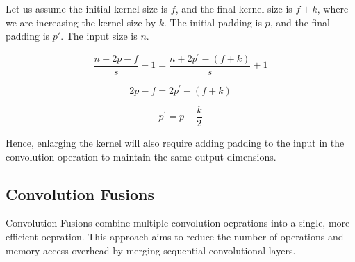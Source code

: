 \documentclass[12pt,a4paper,twoside,openright,bibliography=totocnumbered]{report}
\begin{document}
              Let us assume the initial kernel size is $f$, and the final kernel size is $f+k$, where we are increasing the kernel size by $k$. The initial padding is $p$, and the final padding is $p'$. The input size is $n$.

               \begin{equation}
                    \frac{n+2p-f}{s} + 1 = \frac{n+2p^\prime-(f+k)}{s} + 1
                \label{eq:enlarge1}
                \end{equation}

                \begin{equation}
                    2p-f= 2p^\prime-(f+k)
                \label{eq:enlarge2}
                \end{equation}

                \begin{equation}
                    \boxed{p^\prime = p + \frac{k}{2}}
                \label{eq:enlarge2}
                \end{equation}

                Hence, enlarging the kernel will also require adding padding to the input in the convolution operation to maintain the same output dimensions.

            \subsection{Convolution Fusions}
            Convolution Fusions combine multiple convolution oeprations into a single, more efficient oepration. This approach aims to reduce the number of operations and memory access overhead by merging sequential convolutional layers.
\end{document}
